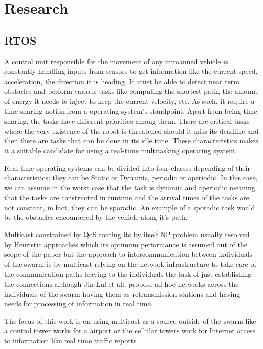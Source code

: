 \documentclass[journal]{IEEEtran}
\begin{document}
\section{Research}
\subsection{RTOS}
A control unit responsible for the movement of any unmanned vehicle is constantly handling inputs from sensors to get information like the current speed, acceleration, the direction it is heading. It must be able to detect near term obstacles and perform various tasks like computing the shortest path, the amount of energy it needs to inject to keep the current velocity, etc. As such, it require a time sharing notion from a operating system's standpoint. Apart from being time sharing, the tasks have different priorities among them. There are critical tasks where the very existence of the robot is threatened should it miss its deadline and then there are tasks that can be done in its idle time. These characteristics makes it a suitable candidate for using a real-time multitasking operating system.

Real time operating systems can be divided into four classes depending of their characteristics; they can be Static or Dynamic, periodic or aperiodic. In this case, we can assume in the worst case that the task is dynamic and aperiodic meaning that the tasks are constructed in runtime and the arrival times of the tasks are not constant, in fact, they can be sporadic. An example of a sporadic task would be the obstacles encountered by the vehicle along it's path.

Multicast constrained by QoS routing its by itself NP problem usually resolved by Heuristic approaches \cite{HH1} which its optimum performance is assumed out of the scope of the paper but the approach to  intercommunication between individuals of the swarm is by multicast relying on the network infrastructure to take care of the communication paths leaving to the individuals the task of just establishing the connections although Jin Lul et all. \cite{HH2} propose ad hoc networks across the individuals of the swarm having them as retransmission stations and having needs for processing of information in real time.

The focus of this work is on using multicast as a source outside of the swarm like a control tower works for a airport or the cellular towers work for Internet access to information like real time traffic reports\cite{YS1}
\end{document}
